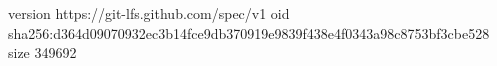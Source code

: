 version https://git-lfs.github.com/spec/v1
oid sha256:d364d09070932ec3b14fce9db370919e9839f438e4f0343a98c8753bf3cbe528
size 349692
